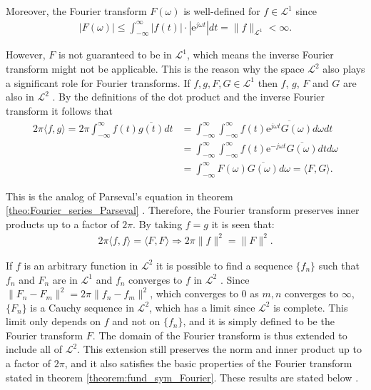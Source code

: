 Moreover, the Fourier transform $F(\omega)$ is well-defined for $f \in \mathcal{L}^1$ since
\begin{align*}
|F(\omega)| \leq \int_{-\infty}^\infty |f(t)| \cdot |\text{e}^{j \omega t}| dt = \|f\|_{\mathcal{L}^1} < \infty.
\end{align*}

However, $F$ is not guaranteed to be in $\mathcal{L}^1$, which means the inverse Fourier transform might not be applicable. This is the reason why the space $\mathcal{L}^2$ also plays a significant role for Fourier transforms. If $f, g, F, G \in \mathcal{L}^1$ then $f$, $g$, $F$ and $G$ are also in $\mathcal{L}^2$ \cite{page 219, FAA}. By the definitions of the dot product and the inverse Fourier transform it follows that
\begin{align*}
2\pi \langle f,g \rangle = 2\pi \int_{-\infty}^\infty f(t) \overline{g(t)} dt &= \int_{-\infty}^\infty \int_{-\infty}^\infty f(t) \overline{\text{e}^{j\omega t} G(\omega)} d\omega dt \\
&= \int_{-\infty}^\infty \int_{-\infty}^\infty f(t) \text{e}^{-j\omega t} \overline{G(\omega)} dt d\omega \\
&= \int_{-\infty}^\infty F(\omega) \overline{G(\omega)} d\omega = \langle F,G \rangle.
\end{align*}

This is the analog of Parseval's equation in theorem \ref{theo:Fourier_series_Parseval} \cite{page 221, FAA}. Therefore, the Fourier transform preserves inner products up to a factor of $2\pi$. By taking $f = g$ it is seen that:
\begin{align*}
2\pi \langle f,f \rangle = \langle F,F \rangle \Rightarrow 2\pi \|f\|^2 = \|F\|^2.
\end{align*}

If $f$ is an arbitrary function in $\mathcal{L}^2$ it is possible to find a sequence $\{f_n\}$ such that $f_n$ and $F_n$ are in $\mathcal{L}^1$ and $f_n$ converges to $f$ in $\mathcal{L}^2$ \cite{page 82, FAA}. Since $\|F_n - F_m\|^2 = 2\pi\|f_n - f_m\|^2$, which converges to 0 as $m,n$ converges to $\infty$, $\{F_n\}$ is a Cauchy sequence in $\mathcal{L}^2$, which has a limit since $\mathcal{L}^2$ is complete. This limit only depends on $f$ and not on $\{f_n\}$, and it is simply defined to be the Fourier transform $F$. The domain of the Fourier transform is thus extended to include all of $\mathcal{L}^2$. This extension still preserves the norm and inner product up to a factor of $2\pi$, and it also satisfies the basic properties of the Fourier transform stated in theorem \ref{theorem:fund_sym_Fourier}. These results are stated below \cite{page 222, FAA}.

